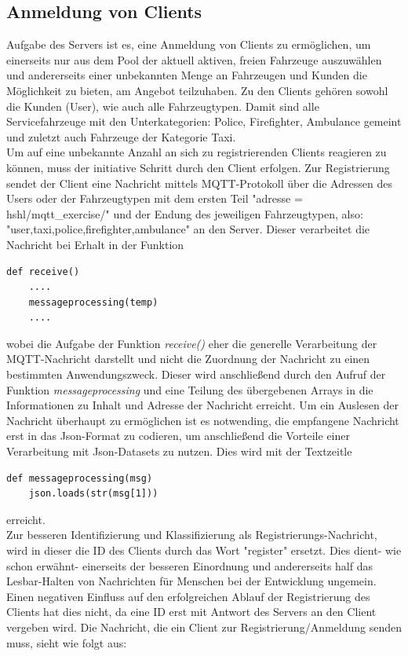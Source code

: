 \subsection{Anmeldung von Clients}
Aufgabe des Servers ist es, eine Anmeldung von Clients zu ermöglichen, um einerseits nur aus dem Pool der aktuell aktiven, freien Fahrzeuge auszuwählen und andererseits einer unbekannten Menge an Fahrzeugen und Kunden die Möglichkeit zu bieten, am Angebot teilzuhaben. Zu den Clients gehören sowohl die Kunden (User), wie auch alle Fahrzeugtypen. Damit sind alle Servicefahrzeuge mit den Unterkategorien: Police, Firefighter, Ambulance gemeint und zuletzt auch Fahrzeuge der Kategorie Taxi.\\
Um auf eine unbekannte Anzahl an sich zu registrierenden Clients reagieren zu können, muss der initiative Schritt durch den Client erfolgen. Zur Registrierung sendet der Client eine Nachricht mittels MQTT-Protokoll über die Adressen des Users oder der Fahrzeugtypen mit dem ersten Teil \textsf{"adresse = hshl/mqtt\_exercise/"} und der Endung des jeweiligen Fahrzeugtypen, also: \textsf{"user,taxi,police,firefighter,ambulance"} an den Server. Dieser verarbeitet die Nachricht bei Erhalt in der Funktion
\begin{lstlisting}
def receive()
	....
	messageprocessing(temp)
	....
\end{lstlisting}
 wobei die Aufgabe der Funktion  \textit{receive()} eher die generelle Verarbeitung der MQTT-Nachricht darstellt und nicht die Zuordnung der Nachricht zu einen bestimmten Anwendungszweck.
Dieser wird anschließend durch den Aufruf der Funktion \textit{messageprocessing} und eine Teilung des übergebenen Arrays in die Informationen zu Inhalt und Adresse der Nachricht erreicht.
Um ein Auslesen der Nachricht überhaupt zu ermöglichen ist es notwending, die empfangene Nachricht erst in das Json-Format zu codieren, um anschließend die Vorteile einer Verarbeitung mit Json-Datasets zu nutzen. Dies wird mit der Textzeitle \begin{lstlisting}
def messageprocessing(msg)
	json.loads(str(msg[1]))
\end{lstlisting}
 erreicht.\\
 Zur besseren Identifizierung und Klassifizierung als Registrierungs-Nachricht, wird in dieser die ID des Clients durch das Wort "register" ersetzt. Dies dient- wie schon erwähnt- einerseits der besseren Einordnung und andererseits half das Lesbar-Halten von Nachrichten für Menschen bei der Entwicklung ungemein. Einen negativen Einfluss auf den erfolgreichen Ablauf der Registrierung des Clients hat dies nicht, da eine ID erst mit Antwort des Servers an den Client vergeben wird. Die Nachricht, die ein Client zur Registrierung/Anmeldung senden muss, sieht wie folgt aus:
